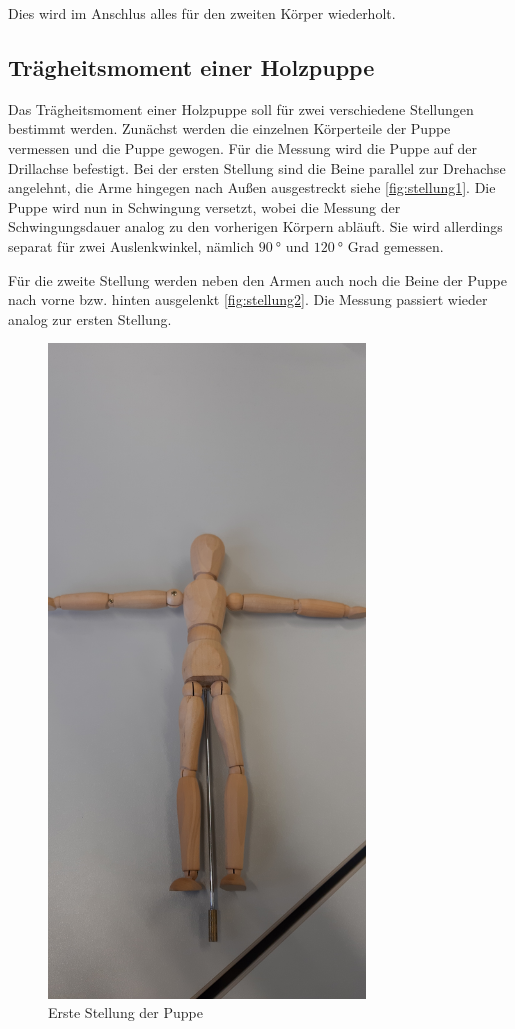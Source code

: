 \noindent
Dies wird im Anschlus alles für den zweiten Körper wiederholt.

\subsection{Trägheitsmoment einer Holzpuppe}
Das Trägheitsmoment einer Holzpuppe soll für zwei verschiedene Stellungen bestimmt werden. 
Zunächst werden die einzelnen Körperteile der Puppe vermessen und die Puppe gewogen.
Für die Messung wird die Puppe auf der Drillachse befestigt. Bei der ersten Stellung sind die Beine parallel zur Drehachse angelehnt, die Arme hingegen nach Außen ausgestreckt siehe \autoref{fig:stellung1}.
Die Puppe wird nun in Schwingung versetzt, wobei die Messung der Schwingungsdauer analog zu den vorherigen Körpern abläuft. Sie wird allerdings separat für zwei Auslenkwinkel, nämlich $\SI{90}{\degree}$ und $\SI{120}{\degree}$ Grad
gemessen.

\noindent
Für die zweite Stellung werden neben den Armen auch noch die Beine der Puppe nach vorne bzw. hinten ausgelenkt \autoref{fig:stellung2}. Die Messung passiert wieder analog zur ersten Stellung.

\begin{figure}[H]
    \centering
    \includegraphics[width=0.75\textwidth, angle=-90]{Bilder/Stellung1.jpg}
    \caption{Erste Stellung der Puppe}
    \label{fig:stellung1}
  \end{figure}
  
